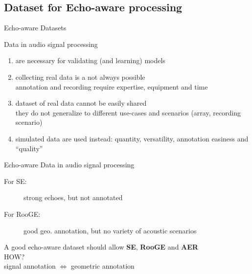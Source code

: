 \subsection{Dataset for Echo-aware processing}

\begin{frame}{Echo-aware Datasets}

    \begin{block}{\alert{Data} in audio signal processing}
        \begin{enumerate}
            \item are necessary for validating (and learning) models
            \item collecting real data is a not always possible
            \\\hspace{.3em} annotation and recording require expertise, equipment and \alert{time}
            \item dataset of real data cannot be easily shared
            \\\hspace{.3em} they do not generalize to different use-cases and scenarios (array, recording scenario)
            \item \alert{simulated data} are used instead: quantity, versatility, annotation easiness and ``quality''
        \end{enumerate}
    \end{block}

    \begin{block}{\alert{Echo-aware Data} in audio signal processing}
        \begin{description}
            \item[For SE:] strong echoes, but not annotated
            \\{\small\cite{szoke2019building,bertin2019voicehome,remaggi2016acoustic}}
            \item[For RooGE:] good geo. annotation, but no variety of acoustic scenarios
            \\{\small\cite{dokmanic2013acoustic,crocco2017uncalibrated,remaggi2019modeling}}
        \end{description}
    \end{block}

    \begin{center}
        \textcolor{myred}{A good echo-aware dataset should allow \textbf{SE}, \textbf{RooGE} and \textbf{AER}
        \\HOW?
        \\signal annotation \quad $\Longleftrightarrow$ \quad geometric annotation}
    \end{center}

\end{frame}

